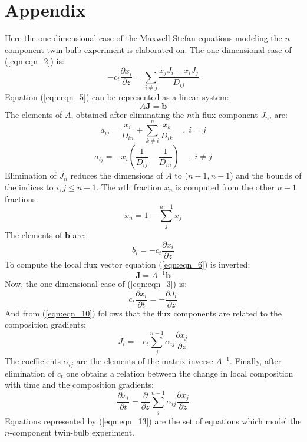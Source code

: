 \documentclass[11]{Report}
\begin{document}
\section*{Appendix}
Here the one-dimensional case of the Maxwell-Stefan equations modeling the $n$-component twin-bulb experiment is elaborated on. The one-dimensional case of (\ref{eqn:eqn_2}) is:
\begin{equation}
\label{eqn:eqn_5}
-c_t \frac{\partial x_i}{\partial z} = \sum_{i \neq j} \frac{x_j J_i - x_i J_j}{D_{ij}}
\end{equation}
Equation (\ref{eqn:eqn_5}) can be represented as a linear system:
\begin{equation}
\label{eqn:eqn_6}
A \textbf{J} = \textbf{b}
\end{equation}
The elements of $A$, obtained after eliminating the $n$th flux component $J_n$, are:
\begin{equation}
\label{eqn:eqn_7}
a_{ij} = \frac{x_i}{D_{in}} + \sum_{k \neq i}^n \frac{x_k}{D_{ik}} \;\;\;\;,\; i = j
\end{equation}
\begin{equation}
\label{eqn:eqn_8}
a_{ij} = -x_i \left( \frac{1}{D_{ij}} - \frac{1}{D_{in}} \right) \;\;\;\;,\; i \neq j
\end{equation}
Elimination of $J_n$ reduces the dimensions of $A$ to ($n - 1, n - 1$) and the bounds of the indices to $i, j \leq n - 1$. The $n$th fraction $x_n$ is computed from the other $n - 1$ fractions:
\begin{equation}
\label{eqn:eqn_8b}
x_n = 1 - \sum_j^{n - 1}x_j
\end{equation}
The elements of $\textbf{b}$ are:
\begin{equation}
\label{eqn:eqn_9}
b_i = -c_t \frac{\partial x_i}{\partial z}
\end{equation}
To compute the local flux vector equation (\ref{eqn:eqn_6}) is inverted:
\begin{equation}
\label{eqn:eqn_10}
\textbf{J} = A^{-1} \textbf{b}
\end{equation}
Now, the one-dimensional case of (\ref{eqn:eqn_3}) is:
\begin{equation}
\label{eqn:eqn_11}
c_t \frac{\partial x_i}{\partial t} = - \frac{\partial J_i}{\partial z}
\end{equation}
And from (\ref{eqn:eqn_10}) follows that the flux components are related to the composition gradients:
\begin{equation}
\label{eqn:eqn_12}
J_i = -c_t \sum_j^{n - 1} \alpha_{ij} \frac{\partial x_j}{\partial z} 
\end{equation}
The coefficients $\alpha_{ij}$ are the elements of the matrix inverse $A^{-1}$. Finally, after elimination of $c_t$ one obtains a relation between the change in local composition with time and the composition gradients:
\begin{equation}
\label{eqn:eqn_13}
\frac{\partial x_i}{\partial t} = \frac{\partial}{\partial z} \sum_j^{n - 1} \alpha_{ij} \frac{\partial x_j}{\partial z} 
\end{equation}
Equations represented by (\ref{eqn:eqn_13}) are the set of equations which model the $n$-component twin-bulb experiment.
\end{document}
